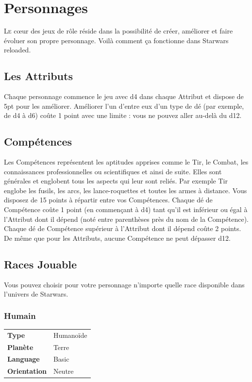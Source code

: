 
\section{Personnages}
\lettrine{L}{e} c\oe{}ur des jeux de rôle réside dans la possibilité de créer, améliorer et faire évoluer son propre personnage. Voilà comment ça fonctionne dans {\jedifont Starwars reloaded}. 

\subsection{Les Attributs}
Chaque personnage commence le jeu avec d4 dans chaque Attribut et dispose de 5pt pour les améliorer. Améliorer l'un d'entre eux d’un type de dé (par exemple, de d4 à d6) coûte 1 point avec une limite : vous ne pouvez aller au-delà du d12.

\subsection{Compétences}
Les Compétences représentent les aptitudes apprises comme le Tir, le Combat, les connaissances professionnelles ou scientifiques et ainsi de suite. Elles sont générales et englobent tous les aspects qui leur sont reliés. Par exemple Tir englobe les fusils, les arcs, les lance-roquettes et toutes les armes à distance. Vous disposez de 15 points à répartir entre vos Compétences. Chaque dé de Compétence coûte 1 point (en commençant à d4) tant qu’il est inférieur ou égal à l’Attribut dont il dépend (noté entre parenthèses près du nom de la Compétence). Chaque dé de Compétence supérieur à l’Attribut dont il dépend coûte 2 points. De même que pour les Attributs, aucune Compétence ne peut dépasser d12.

\subsection{Races Jouable}
Vous pouvez choisir pour votre personnage n’importe quelle race disponible dans l'univers de Starwars. 

\subsubsection{Humain}
\begin{flushright}
\begin{tabular}{ l l }
	\textbf{Type} 			& Humanoïde \\
   	\textbf{Planète} 		& Terre \\
   	\textbf{Language} 		& Basic \\
   	\textbf{Orientation} 	& Neutre \\
\end{tabular}
\vspace{-6\baselineskip}
\end{flushright}


